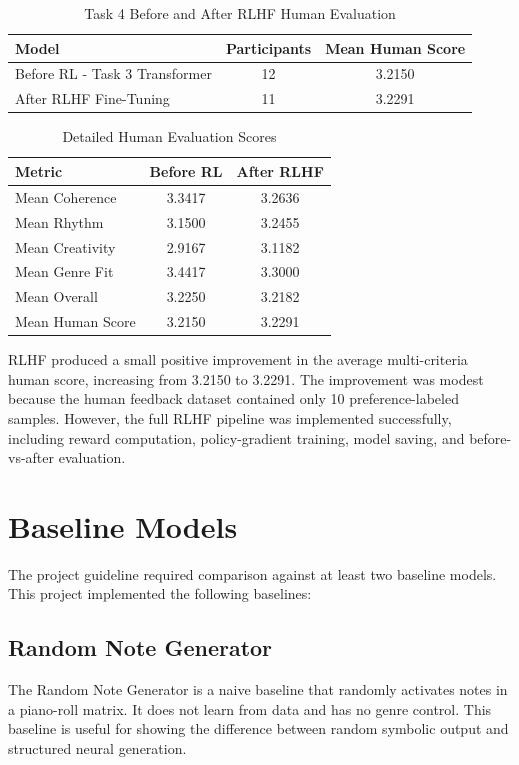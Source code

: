 \documentclass[conference]{IEEEtran}
\begin{document}
\begin{table}[h]
\centering
\caption{Task 4 Before and After RLHF Human Evaluation}
\begin{tabular}{lcc}
\toprule
Model & Participants & Mean Human Score \\
\midrule
Before RL - Task 3 Transformer & 12 & 3.2150 \\
After RLHF Fine-Tuning & 11 & 3.2291 \\
\bottomrule
\end{tabular}
\end{table}

\begin{table}[h]
\centering
\caption{Detailed Human Evaluation Scores}
\begin{tabular}{lcc}
\toprule
Metric & Before RL & After RLHF \\
\midrule
Mean Coherence & 3.3417 & 3.2636 \\
Mean Rhythm & 3.1500 & 3.2455 \\
Mean Creativity & 2.9167 & 3.1182 \\
Mean Genre Fit & 3.4417 & 3.3000 \\
Mean Overall & 3.2250 & 3.2182 \\
Mean Human Score & 3.2150 & 3.2291 \\
\bottomrule
\end{tabular}
\end{table}

RLHF produced a small positive improvement in the average multi-criteria human score, increasing from 3.2150 to 3.2291. The improvement was modest because the human feedback dataset contained only 10 preference-labeled samples. However, the full RLHF pipeline was implemented successfully, including reward computation, policy-gradient training, model saving, and before-vs-after evaluation.

\section{Baseline Models}

The project guideline required comparison against at least two baseline models. This project implemented the following baselines:

\subsection{Random Note Generator}

The Random Note Generator is a naive baseline that randomly activates notes in a piano-roll matrix. It does not learn from data and has no genre control. This baseline is useful for showing the difference between random symbolic output and structured neural generation.
\end{document}
